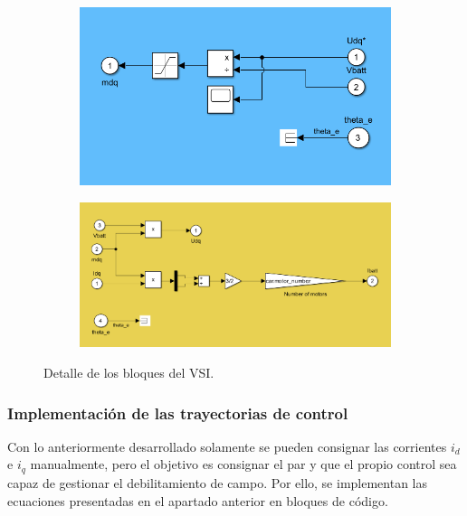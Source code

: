 \begin{figure}[H]
    \centering
    \begin{subfigure}{0.45\linewidth}
        \centering
        \includegraphics[width=\linewidth]{fig/VSIEMR_in1.png}
    \end{subfigure}
    \begin{subfigure}{0.45\linewidth}
        \centering
        \includegraphics[width=\linewidth]{fig/VSIEMR_in2.png}
    \end{subfigure}
    \caption{Detalle de los bloques del VSI.}

\end{figure}

\subsubsection{Implementación de las trayectorias de control}

Con lo anteriormente desarrollado solamente se pueden consignar las corrientes $i_d$ e $i_q$ manualmente, pero el objetivo es consignar el par y que el propio control sea capaz de gestionar el debilitamiento de campo. Por ello, se implementan las ecuaciones presentadas en el apartado anterior en bloques de código. 

